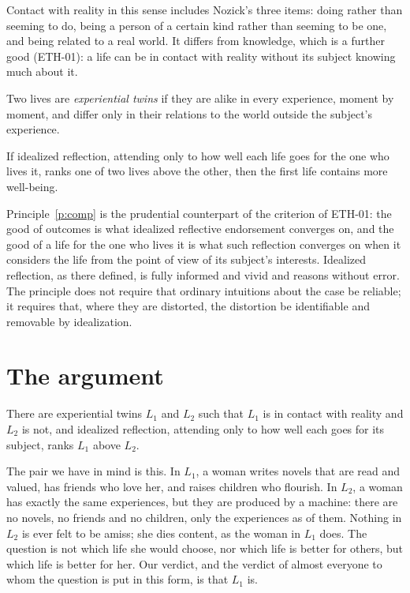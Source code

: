 \documentclass{situationist-preprint}
\begin{document}
Contact with reality in this sense includes Nozick's three items: doing rather than seeming to do, being a person of a certain kind rather than seeming to be one, and being related to a real world. It differs from knowledge, which is a further good (ETH-01): a life can be in contact with reality without its subject knowing much about it.

\begin{definition}\label{d:twins}
Two lives are \emph{experiential twins} if they are alike in every experience, moment by moment, and differ only in their relations to the world outside the subject's experience.
\end{definition}

\begin{principle}\label{p:comp}
If idealized reflection, attending only to how well each life goes for the one who lives it, ranks one of two lives above the other, then the first life contains more well-being.
\end{principle}

Principle~\ref{p:comp} is the prudential counterpart of the criterion of ETH-01: the good of outcomes is what idealized reflective endorsement converges on, and the good of a life for the one who lives it is what such reflection converges on when it considers the life from the point of view of its subject's interests. Idealized reflection, as there defined, is fully informed and vivid and reasons without error. The principle does not require that ordinary intuitions about the case be reliable; it requires that, where they are distorted, the distortion be identifiable and removable by idealization.

\section{The argument}

\begin{assumption}\label{a:verdict}
There are experiential twins $L_1$ and $L_2$ such that $L_1$ is in contact with reality and $L_2$ is not, and idealized reflection, attending only to how well each goes for its subject, ranks $L_1$ above $L_2$.
\end{assumption}

The pair we have in mind is this. In $L_1$, a woman writes novels that are read and valued, has friends who love her, and raises children who flourish. In $L_2$, a woman has exactly the same experiences, but they are produced by a machine: there are no novels, no friends and no children, only the experiences as of them. Nothing in $L_2$ is ever felt to be amiss; she dies content, as the woman in $L_1$ does. The question is not which life she would choose, nor which life is better for others, but which life is better for her. Our verdict, and the verdict of almost everyone to whom the question is put in this form, is that $L_1$ is.
\end{document}
